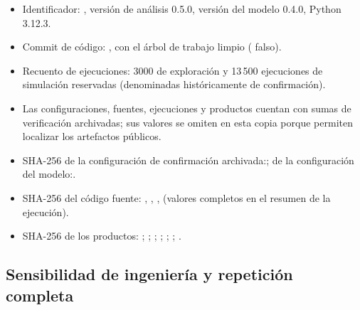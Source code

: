\begin{itemize}
  \raggedright
  \item Identificador: \code{\RunID}, versión de análisis 0.5.0, versión del modelo 0.4.0, Python 3.12.3.
  \item Commit de código: \ifdefined\blindreviewmode{}\else{}\fi, con el árbol de trabajo limpio ( falso).
  \item Recuento de ejecuciones: 3000 de exploración y 13\,500 ejecuciones de simulación reservadas (denominadas históricamente de confirmación).
  \ifdefined\blindreviewmode
  \item Las configuraciones, fuentes, ejecuciones y productos cuentan con sumas de verificación archivadas; sus valores se omiten en esta copia porque permiten localizar los artefactos públicos.
  \else
  \item SHA-256 de la configuración de confirmación archivada:\newline{}; de la configuración del modelo:\newline{}.
  \item SHA-256 del código fuente:  ,  ,  ,   (valores completos en el resumen de la ejecución).
  \item SHA-256 de los productos:  ;  ;  ;  ;\newline{} ;\newline{} ;  .
  \fi
\end{itemize}

\subsection*{Sensibilidad de ingeniería y repetición completa}

